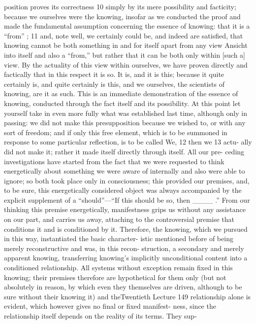 position proves its correctness 10 simply by its mere possibility and facticity;
because we ourselves were the knowing, insofar as we conducted the proof and
made the fundamental assumption concerning the essence of knowing: that it
is a “from” ; 11 and, note well, we certainly could be, and indeed are satisfied, that
knowing cannot be both something in and for itself apart from any view
{Ansicht} into itself and also a “from,” but rather that it can be both only within
[such a] view. By the actuality of this view within ourselves, we have proven
directly and factically that in this respect it is so. It is, and it is this; because it
quite certainly is, and quite certainly is this, and we ourselves, the scientists of
knowing, are it as such. This is an immediate demonstration of the essence of
knowing, conducted through the fact itself and its possibility. At this point let
yourself take in even more fully what was established last time, although only
in passing: we did not make this presupposition because we wished to, or with
any sort of freedom; and if only this free element, which is to be summoned
in response to some particular reflection, is to be called We, 12 then we 13 actu-
ally did not make it; rather it made itself directly through itself. All our pre-
ceding investigations have started from the fact that we were requested to
think energetically about something we were aware of internally and also were
able to ignore; so both took place only in consciousness; this provided our
premises, and, to be sure, this energetically considered object was always
accompanied by the explicit supplement of a “should”—“If this should be so,
then ____ .” From our thinking this premise energetically, manifestness grips
us without any assistance on our part, and carries us away, attaching to the
controversial premise that conditions it and is conditioned by it. Therefore,
the knowing, which we pursued in this way, instantiated the basic character-
istic mentioned before of being merely reconstructive and was, in this recon-
struction, a secondary and merely apparent knowing, transferring knowing’s
implicitly unconditional content into a conditioned relationship. All systems
without exception remain fixed in this knowing; their premises therefore are
hypothetical for them only (but not absolutely in reason, by which even they
themselves are driven, although to be sure without their knowing it) and theTwentieth Lecture
149
relationship alone is evident, which however gives no final or fixed manifest-
ness, since the relationship itself depends on the reality of its terms. They sup-

